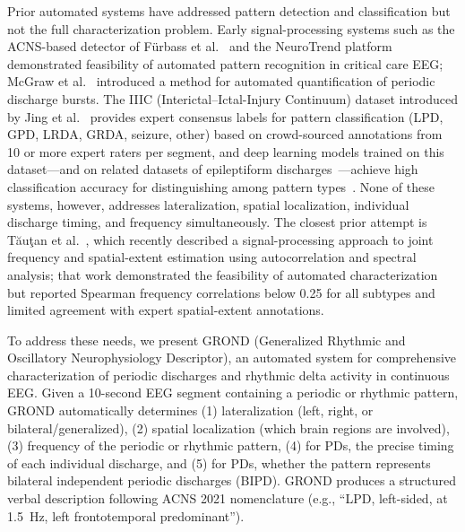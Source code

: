 \documentclass{iopjournal}
\begin{document}
Prior automated systems have addressed pattern detection and classification but not the full characterization problem. Early signal-processing systems such as the ACNS-based detector of F\"urbass et al.~\cite{furbass2015} and the NeuroTrend platform~\cite{herta2015} demonstrated feasibility of automated pattern recognition in critical care EEG; McGraw et al.~\cite{mcgraw2024} introduced a method for automated quantification of periodic discharge bursts. The IIIC (Interictal--Ictal-Injury Continuum) dataset introduced by Jing et al.~\cite{jing2023} provides expert consensus labels for pattern classification (LPD, GPD, LRDA, GRDA, seizure, other) based on crowd-sourced annotations from 10 or more expert raters per segment, and deep learning models trained on this dataset---and on related datasets of epileptiform discharges~\cite{jing2020}---achieve high classification accuracy for distinguishing among pattern types~\cite{ge2023,zheng2022}. None of these systems, however, addresses lateralization, spatial localization, individual discharge timing, and frequency simultaneously. The closest prior attempt is T\u{a}u\c{t}an et al.~\cite{tautan2025}, which recently described a signal-processing approach to joint frequency and spatial-extent estimation using autocorrelation and spectral analysis; that work demonstrated the feasibility of automated characterization but reported Spearman frequency correlations below 0.25 for all subtypes and limited agreement with expert spatial-extent annotations.

To address these needs, we present GROND (Generalized Rhythmic and Oscillatory Neurophysiology Descriptor), an automated system for comprehensive characterization of periodic discharges and rhythmic delta activity in continuous EEG. Given a 10-second EEG segment containing a periodic or rhythmic pattern, GROND automatically determines (1) lateralization (left, right, or bilateral/generalized), (2) spatial localization (which brain regions are involved), (3) frequency of the periodic or rhythmic pattern, (4) for PDs, the precise timing of each individual discharge, and (5) for PDs, whether the pattern represents bilateral independent periodic discharges (BIPD). GROND produces a structured verbal description following ACNS 2021 nomenclature (e.g., ``LPD, left-sided, at 1.5~Hz, left frontotemporal predominant'').
\end{document}
